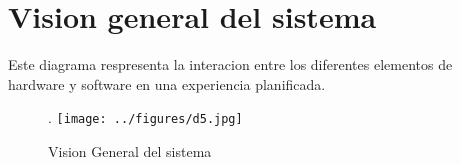 \section{Vision general del sistema}

Este diagrama respresenta la interacion entre los diferentes elementos de hardware y software en una experiencia planificada.

\begin{figure}[!htb].
    \texttt{[image: ../figures/d5.jpg]}
    \caption{Vision General del sistema}
    \label{fig:d1}
\end{figure}

\newpage